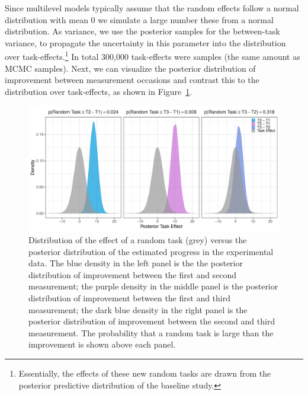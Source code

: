 \documentclass[a4paper]{article}
\newcommand{\DON}	[1] 	{\todo[linecolor=gray, backgroundcolor=white]	{Don: 	{#1}}}
\begin{document}
Since \DON{tot hier gekomen!}multilevel models typically assume that the random effects follow a normal distribution with mean 0 we simulate a large number these from a normal distribution. As variance, we use the posterior samples for the between-task variance, to propagate the uncertainty in this parameter into the distribution over task-effects.\footnote{Essentially, the effects of these new random tasks are drawn from the posterior predictive distribution of the baseline study.} In total 300,000 task-effects were samples (the same amount as MCMC samples). Next, we can visualize the posterior distribution of improvement between measurement occasions and contrast this to the distribution over task-effects, as shown in Figure~\ref{fig:posteriorImprovement}.
\begin{figure}[!ht]
	\centering
	\includegraphics[width=\textwidth]{figures/compareTaskEffects.pdf}
	\caption{Distribution of the effect of a random task (grey) versus the posterior distribution of the estimated progress in the experimental data. The blue density in the left panel is the the posterior distribution of improvement between the first and second measurement; the purple density in the middle panel is the posterior distribution of improvement between the first and third measurement; the dark blue density in the right panel is the posterior distribution of improvement between the second and third measurement. The probability that a random task is large than the improvement is shown above each panel.}
	\label{fig:posteriorImprovement}
\end{figure}
\end{document}
